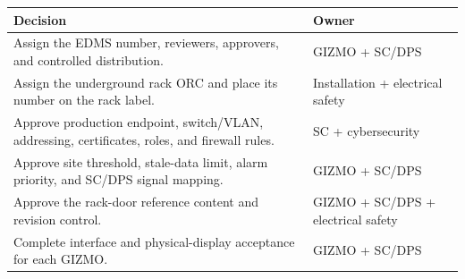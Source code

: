 \documentclass{cernatlasnote}
\begin{document}
\Needspace{0.28\textheight}
\begingroup
\small
\begin{longtable}{L{0.60\textwidth} L{0.30\textwidth}}
\toprule
\textbf{Decision} & \textbf{Owner} \\
\midrule
Assign the EDMS number, reviewers, approvers, and controlled distribution. &
GIZMO + SC/DPS \\
Assign the underground rack ORC and place its number on the rack label. &
Installation + electrical safety \\
Approve production endpoint, switch/VLAN, addressing, certificates, roles,
and firewall rules. & SC + cybersecurity \\
Approve site threshold, stale-data limit, alarm priority, and SC/DPS signal
mapping. & GIZMO + SC/DPS \\
Approve the rack-door reference content and revision control. & GIZMO + SC/DPS +
electrical safety \\
Complete interface and physical-display acceptance for each GIZMO. &
GIZMO + SC/DPS \\
\bottomrule
\end{longtable}
\endgroup
\end{document}
